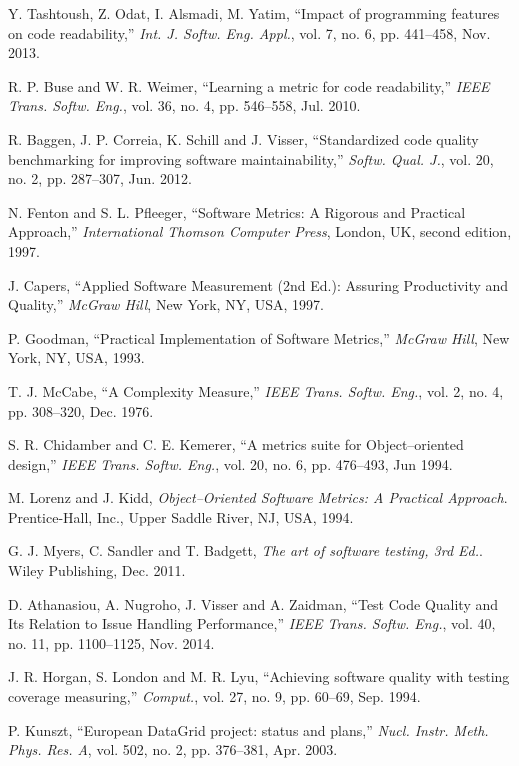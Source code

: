 \begin{thebibliography}{1}
Y. Tashtoush, Z. Odat, I. Alsmadi, M. Yatim,
``Impact of programming features on code readability,''
\emph{Int. J. Softw. Eng. Appl.},
vol. 7, no. 6, pp. 441--458, Nov. 2013.

R. P. Buse and W. R. Weimer,
``Learning a metric for code readability,''
\emph{IEEE Trans. Softw. Eng.},
vol. 36, no. 4, pp. 546--558, Jul. 2010.

R. Baggen, J. P. Correia, K. Schill and J. Visser,
``Standardized code quality benchmarking for improving software maintainability,''
\emph{Softw. Qual. J.},
vol. 20, no. 2, pp. 287--307, Jun. 2012.

N. Fenton  and  S.  L.  Pfleeger,
``Software  Metrics:  A  Rigorous  and  Practical Approach,''
\emph{International Thomson Computer Press},
London, UK, second edition, 1997.

J. Capers,
``Applied Software Measurement (2nd Ed.): Assuring Productivity and Quality,''
\emph{McGraw Hill}, New York, NY, USA, 1997.

P. Goodman,
``Practical Implementation of Software Metrics,''
\emph{McGraw Hill}, New York, NY, USA, 1993.

T. J. McCabe,
``A Complexity Measure,''
\emph{IEEE Trans. Softw. Eng.},
vol. 2, no. 4, pp. 308--320, Dec. 1976.

S. R. Chidamber and C. E. Kemerer,
``A metrics suite for Object--oriented design,''
\emph{IEEE Trans. Softw. Eng.},
vol. 20, no. 6, pp. 476--493, Jun 1994.

M. Lorenz and J. Kidd,
\emph{Object--Oriented Software Metrics: A Practical Approach}.
Prentice-Hall, Inc., Upper Saddle River, NJ, USA, 1994.

G. J. Myers, C. Sandler and T. Badgett,
\emph{The art of software testing, 3rd Ed.}.
Wiley Publishing, Dec. 2011.

D. Athanasiou, A. Nugroho, J. Visser and A. Zaidman,
``Test Code Quality and Its Relation to Issue Handling Performance,''
\emph{IEEE Trans. Softw. Eng.},
vol. 40, no. 11, pp. 1100--1125, Nov. 2014.

J. R. Horgan, S. London and M. R. Lyu,
``Achieving software quality with testing coverage measuring,''
\emph{Comput.},
vol. 27, no. 9, pp. 60--69, Sep. 1994.

P. Kunszt,
``European DataGrid project: status and plans,''
\emph{Nucl. Instr. Meth. Phys. Res. A},
vol. 502, no. 2, pp. 376--381, Apr. 2003.


\end{thebibliography}
